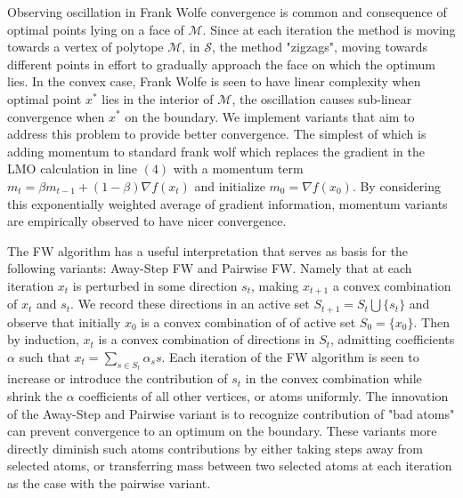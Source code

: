 \documentclass{article}
\begin{document}
Observing oscillation in Frank Wolfe convergence is common and consequence of optimal points lying on a face of $\mathcal{M}$. Since at each iteration the method is moving towards a vertex of polytope $\mathcal{M}$, in $\mathcal{S}$, the method "zigzags", moving towards different points in effort to gradually approach the face on which the optimum lies. In the convex case, Frank Wolfe is seen to have linear complexity when optimal point $x^*$ lies in the interior of $\mathcal{M}$, the oscillation causes sub-linear convergence when $x^*$ on the boundary.
 We implement variants that aim to address this problem to provide better convergence. The simplest of which is adding momentum to standard frank wolf which replaces the gradient in the LMO calculation in line $(4)$ with a momentum term $m_t  = \beta m_{t-1} + (1-\beta) \nabla f(x_t)$ and initialize $m_0 = \nabla f(x_0)$. By considering this exponentially weighted average of gradient information, momentum variants are empirically observed to have nicer convergence. 

The FW algorithm has a useful interpretation that serves as basis for the following variants: Away-Step FW and Pairwise FW. Namely that at each iteration $x_t$ is perturbed in some direction $s_t$, making $x_{t+1}$ a convex combination of $x_t$ and $s_t$. We record these directions in an active set $S_{t+1} = S_t \bigcup \{s_t\}$ and observe that initially $x_0$ is a convex combination of of active set $S_0 = \{x_0\}$. Then by induction, $x_t$ is a convex combination of directions in $S_t$, admitting coefficients $\alpha$ such that $x_t = \sum_{s \in S_t} \alpha_{s} s$.
Each iteration of the FW algorithm is seen to increase or introduce the contribution of $s_t$ in the convex combination while shrink the $\alpha$ coefficients of all other vertices, or atoms uniformly.
The innovation of the Away-Step and Pairwise variant is to recognize contribution of "bad atoms" can prevent convergence to an optimum on the boundary. These variants more directly diminish such atoms contributions by either taking steps away from selected atoms, or transferring mass between two selected atoms at each iteration as the case with the pairwise variant.
\end{document}
